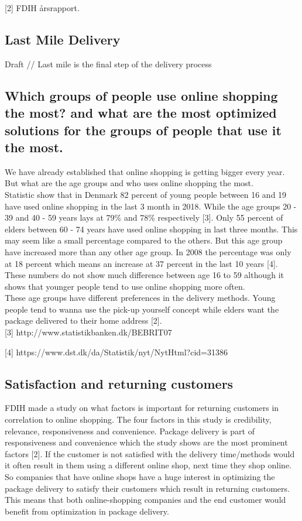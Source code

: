 \documentclass[12pt]{report}
\begin{document}
[2] FDIH årsrapport.

\subsection{Last Mile Delivery }
Draft //
Last mile is the final step of the delivery process



\subsection{Which groups of people use online shopping the most? and what are the most optimized solutions for the groups of people that use it the most.}
We have already established that online shopping is getting bigger every year. But what are the age groups and who uses online shopping the most. \\
Statistic show that in Denmark 82 percent of young people between 16 and 19 have used online shopping in the last 3 month in 2018. While the age groups 20 - 39 and 40 - 59 years lays at 79\% and 78\% respectively [3]. Only 55 percent of elders between 60 - 74 years have used online shopping in last three months. This may seem like a small percentage compared to the others. But this age group have increased more than any other age group. In 2008 the percentage was only at 18 percent which means an increase at 37 percent in the last 10 years [4]. \\
These numbers do not show much difference between age 16 to 59 although it shows that younger people tend to use online shopping more often. \\
These age groups have different preferences in the delivery methods. Young people tend to wanna use the pick-up yourself concept while elders want the package delivered to their home address [2]. \\

[3] http://www.statistikbanken.dk/BEBRIT07

[4] https://www.dst.dk/da/Statistik/nyt/NytHtml?cid=31386


\subsection{Satisfaction and returning customers}
FDIH made a study on what factors is important for returning customers in correlation to online shopping. The four factors in this study is credibility, relevance, responsiveness and convenience. Package delivery is part of responsiveness and convenience which the study shows are the most prominent factors [2]. If the customer is not satisfied with the delivery time/methods would it often result in them using a different online shop, next time they shop online. So companies that have online shops have a huge interest in optimizing the package delivery to satisfy their customers which result in returning customers. This means that both online-shopping companies and the end customer would benefit from optimization in package delivery.
\end{document}

